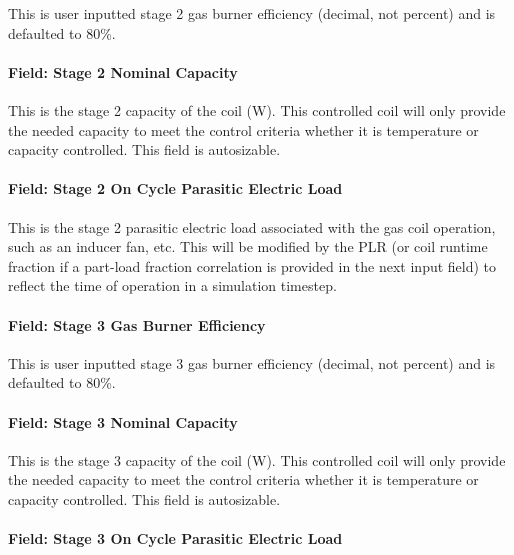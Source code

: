 This is user inputted stage 2 gas burner efficiency (decimal, not percent) and is defaulted to 80\%.

\paragraph{Field: Stage 2 Nominal Capacity}\label{field-stage-2-nominal-capacity-1}

This is the stage 2 capacity of the coil (W). This controlled coil will only provide the needed capacity to meet the control criteria whether it is temperature or capacity controlled. This field is autosizable.

\paragraph{Field: Stage 2 On Cycle Parasitic Electric Load}\label{field-stage-2-parasitic-electric-load}

This is the stage 2 parasitic electric load associated with the gas coil operation, such as an inducer fan, etc. This will be modified by the PLR (or coil runtime fraction if a part-load fraction correlation is provided in the next input field) to reflect the time of operation in a simulation timestep.

\paragraph{Field: Stage 3 Gas Burner Efficiency}\label{field-stage-3-gas-burner-efficiency}

This is user inputted stage 3 gas burner efficiency (decimal, not percent) and is defaulted to 80\%.

\paragraph{Field: Stage 3 Nominal Capacity}\label{field-stage-3-nominal-capacity-1}

This is the stage 3 capacity of the coil (W). This controlled coil will only provide the needed capacity to meet the control criteria whether it is temperature or capacity controlled. This field is autosizable.

\paragraph{Field: Stage 3 On Cycle Parasitic Electric Load}\label{field-stage-3-parasitic-electric-load}

